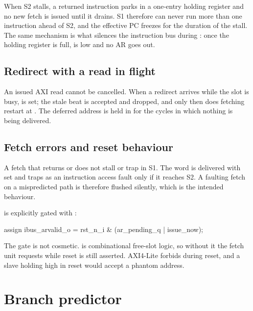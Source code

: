 When S2 stalls, a returned instruction parks in a one-entry holding register and
no new fetch is issued until it drains. S1 therefore can never run more than one
instruction ahead of S2, and the effective PC freezes for the duration of the
stall. The same mechanism is what silences the instruction bus during
: once the holding register is full,  is low and no AR
goes out.

\subsection{Redirect with a read in flight}

An issued AXI read cannot be cancelled. When a redirect arrives while the slot is
busy,  is set; the stale beat is accepted and dropped, and only
then does fetching restart at . The deferred address is held in
 for the cycles in which nothing is being delivered.

\subsection{Fetch errors and reset behaviour}

A fetch that returns  or  does not stall or trap in S1.
The word is delivered with  set and traps as an instruction
access fault only if it reaches S2. A faulting fetch on a mispredicted path is
therefore flushed silently, which is the intended behaviour.

 is explicitly gated with :

\begin{center}
\ttfamily\small
assign ibus\_arvalid\_o = rst\_n\_i \& (ar\_pending\_q | issue\_now);
\end{center}

\begin{rtlnote}
The gate is not cosmetic.  is combinational free-slot logic, so
without it the fetch unit requests  while reset is still asserted.
AXI4-Lite forbids  during reset, and a slave holding 
high in reset would accept a phantom address.
\end{rtlnote}

\section{Branch predictor}

